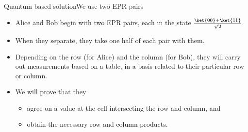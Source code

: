 {\begin{frame}{Quantum-based solution}{We use two EPR pairs}

\begin{itemize}[<+->]
    \item Alice and Bob begin with two EPR pairs, each in the state $\frac{\ket{00}+\ket{11}}{\sqrt{2}}$.
    \item When they separate, they take one half of each pair with them.
    \item Depending on the row (for Alice) and the column (for Bob), they will carry out measurements based on a table, in a basis related to their particular row or column.
    \item We will prove that they
    \begin{itemize}
        \item agree on a value at the cell intersecting the row and column, and
        \item obtain the necessary row and column products.
    \end{itemize}
\end{itemize}
    
\end{frame}

}
